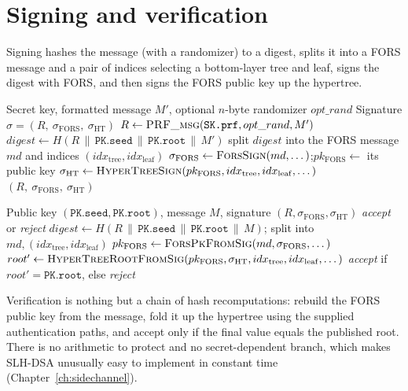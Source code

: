 \section{Signing and verification}
Signing hashes the message (with a randomizer) to a digest, splits it into a FORS message and a pair of indices selecting a bottom-layer tree and leaf, signs the digest with FORS, and then signs the FORS public key up the hypertree.

\begin{algorithm}[H]
\caption{SLH-DSA.Sign (teaching form)}
\label{alg:slhdsa-sign}
\begin{algorithmic}[1]
\Require Secret key, formatted message $M'$, optional $n$-byte randomizer $opt\_rand$
\Ensure Signature $\sigma = (R,\ \sigma_{\mathrm{FORS}},\ \sigma_{\mathrm{HT}})$
\State $R \gets \textsc{PRF\_msg}(\texttt{SK.prf}, opt\_rand, M')$ 
\State $digest \gets H(R \,\|\, \texttt{PK.seed} \,\|\, \texttt{PK.root} \,\|\, M')$
\State split $digest$ into the FORS message $md$ and indices $(idx_{\mathrm{tree}}, idx_{\mathrm{leaf}})$
\State $\sigma_{\mathrm{FORS}} \gets \textsc{ForsSign}(md, \dots)$;\quad $pk_{\mathrm{FORS}} \gets$ its public key
\State $\sigma_{\mathrm{HT}} \gets \textsc{HyperTreeSign}(pk_{\mathrm{FORS}}, idx_{\mathrm{tree}}, idx_{\mathrm{leaf}}, \dots)$
\State \Return $(R,\ \sigma_{\mathrm{FORS}},\ \sigma_{\mathrm{HT}})$
\end{algorithmic}
\end{algorithm}

\begin{algorithm}[H]
\caption{SLH-DSA.Verify (teaching form)}
\label{alg:slhdsa-verify}
\begin{algorithmic}[1]
\Require Public key $(\texttt{PK.seed},\texttt{PK.root})$, message $M$, signature $(R,\sigma_{\mathrm{FORS}},\sigma_{\mathrm{HT}})$
\Ensure \emph{accept} or \emph{reject}
\State $digest \gets H(R \,\|\, \texttt{PK.seed} \,\|\, \texttt{PK.root} \,\|\, M)$; split into $md,(idx_{\mathrm{tree}},idx_{\mathrm{leaf}})$
\State $pk_{\mathrm{FORS}} \gets \textsc{ForsPkFromSig}(md, \sigma_{\mathrm{FORS}}, \dots)$
\State $root' \gets \textsc{HyperTreeRootFromSig}(pk_{\mathrm{FORS}}, \sigma_{\mathrm{HT}}, idx_{\mathrm{tree}}, idx_{\mathrm{leaf}}, \dots)$
\State \Return \emph{accept} if $root' = \texttt{PK.root}$, else \emph{reject}
\end{algorithmic}
\end{algorithm}

Verification is nothing but a chain of hash recomputations: rebuild the FORS public key from the message, fold it up the hypertree using the supplied authentication paths, and accept only if the final value equals the published root. There is no arithmetic to protect and no secret-dependent branch, which makes SLH-DSA unusually easy to implement in constant time (Chapter~\ref{ch:sidechannel}).

